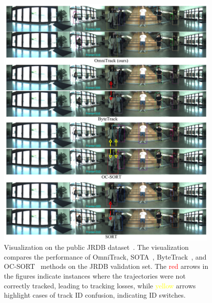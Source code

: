\begin{figure}[!t]
  \centering
  \includegraphics[width=0.98\textwidth]{imgs/jrdb_tracking_vis_2.pdf}
  \caption{Visualization on the public JRDB dataset~\cite{martin2021jrdb}. The visualization compares the performance of OmniTrack, SOTA~\cite{bewley2016simple}, ByteTrack~\cite{zhang2022bytetrack}, and OC-SORT~\cite{cao2023observation} methods on the JRDB validation set. The \textcolor{red}{red} arrows in the figures indicate instances where the trajectories were not correctly tracked, leading to tracking losses, while \textcolor{yellow}{yellow} arrows highlight cases of track ID confusion, indicating ID switches.}
  \label{fig:vis_img_jrdb}
\end{figure}


